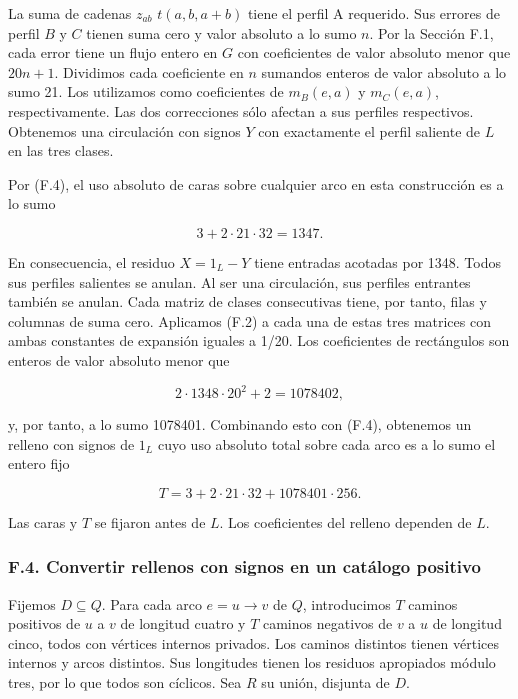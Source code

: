 \documentclass[spanish,11pt,a4paper]{article}
\begin{document}
La suma de cadenas \(z_{ab}\) \(t(a,b,a+b)\) tiene el perfil A requerido. Sus errores de perfil \(B\) y \(C\) tienen suma cero y valor absoluto a lo sumo \(n\). Por la Sección F.1, cada error tiene un flujo entero en \(G\) con coeficientes de valor absoluto menor que \(20n+1\). Dividimos cada coeficiente en \(n\) sumandos enteros de valor absoluto a lo sumo 21. Los utilizamos como coeficientes de \(m_{B}(e,a)\) y \(m_{C}(e,a)\), respectivamente. Las dos correcciones sólo afectan a sus perfiles respectivos. Obtenemos una circulación con signos \(Y\) con exactamente el perfil saliente de \(L\) en las tres clases.

Por (F.4), el uso absoluto de caras sobre cualquier arco en esta construcción es a lo sumo

\[3+2\cdot21\cdot32=1347.\]

En consecuencia, el residuo \(X=1_{L}-Y\) tiene entradas acotadas por 1348. Todos sus perfiles salientes se anulan. Al ser una circulación, sus perfiles entrantes también se anulan. Cada matriz de clases consecutivas tiene, por tanto, filas y columnas de suma cero. Aplicamos (F.2) a cada una de estas tres matrices con ambas constantes de expansión iguales a 1/20. Los coeficientes de rectángulos son enteros de valor absoluto menor que

\[2\cdot1348\cdot20^2+2=1078402,\]

y, por tanto, a lo sumo 1078401. Combinando esto con (F.4), obtenemos un relleno con signos de \(1_{L}\) cuyo uso absoluto total sobre cada arco es a lo sumo el entero fijo

\[T=3+2\cdot21\cdot32+1078401\cdot256.\tag{F.5}\]

Las caras y \(T\) se fijaron antes de \(L\). Los coeficientes del relleno dependen de \(L\).

\subsubsection{F.4. Convertir rellenos con signos en un catálogo positivo}\label{f.4.-convertir-rellenos-con-signos-en-un-catuxe1logo-positivo}

Fijemos \(D\subseteq Q\). Para cada arco \(e=u\to v\) de \(Q\), introducimos \(T\) caminos positivos de \(u\) a \(v\) de longitud cuatro y \(T\) caminos negativos de \(v\) a \(u\) de longitud cinco, todos con vértices internos privados. Los caminos distintos tienen vértices internos y arcos distintos. Sus longitudes tienen los residuos apropiados módulo tres, por lo que todos son cíclicos. Sea \(R\) su unión, disjunta de \(D\).
\end{document}

